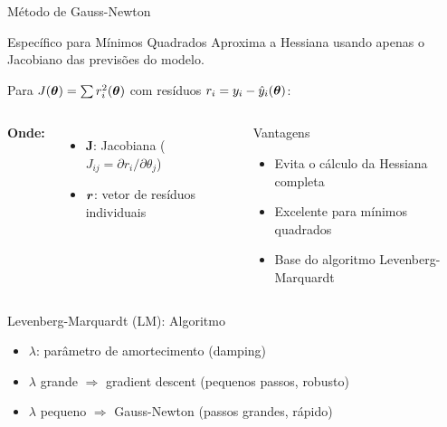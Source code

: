 \begin{frame}{Método de Gauss-Newton}
\begin{block}{Específico para Mínimos Quadrados}\small
Aproxima a Hessiana usando apenas o Jacobiano das previsões do modelo.
\end{block}

Para $J(\boldsymbol{\theta}) = \sum r_i^2(\boldsymbol{\theta})$ com resíduos $r_i = y_i - \hat{y}_i(\boldsymbol{\theta})$:


\begin{columns}
\textbf{Onde:}
\begin{itemize}\scriptsize
    \item $\mathbf{J}$: Jacobiana ($J_{ij} = \partial r_i / \partial \theta_j$)
    \item $\boldsymbol{r}$: vetor de resíduos individuais
\end{itemize}

\begin{exampleblock}{Vantagens}\scriptsize
\begin{itemize}
    \item Evita o cálculo da Hessiana completa
    \item Excelente para mínimos quadrados
    \item Base do algoritmo Levenberg-Marquardt
\end{itemize}
\end{exampleblock}
\end{columns}
\end{frame}

\begin{frame}{Levenberg-Marquardt (LM): Algoritmo}


\begin{itemize}\small
    \item $\lambda$: parâmetro de amortecimento (damping)
    \item $\lambda$ grande $\Rightarrow$ gradient descent (pequenos passos, robusto)
    \item $\lambda$ pequeno $\Rightarrow$ Gauss-Newton (passos grandes, rápido)
\end{itemize}
\end{frame}


